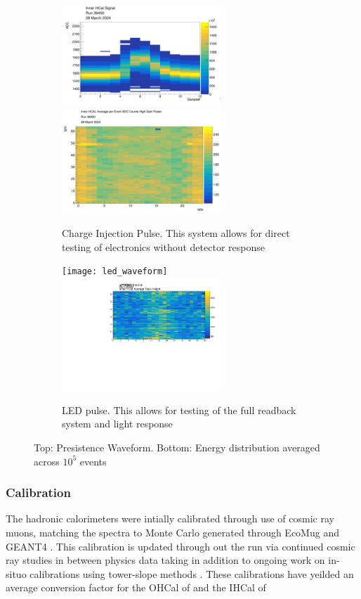 \documentclass[letterpaper, 12pt, oneside]{book}
\theoremstyle{definition}
\begin{document}
		\begin{figure}
			\begin{subfigure}[t]{0.4\textwidth}
				\includegraphics[width=6cm]{pulser_waveform}
				\includegraphics[width=6cm]{ihcal_pulser.png}
				\caption{Charge Injection Pulse. This system allows for direct testing of electronics without detector response}
			\end{subfigure}
			\hfill
			\begin{subfigure}[t]{0.4\textwidth}
				\texttt{[image: led\_waveform]}
				\includegraphics[width=6cm]{ihcal_led}
				\caption{LED pulse. This allows for testing of the full readback system and light response}
			\end{subfigure}
				\caption{Top: Presistence Waveform. Bottom: Energy distribution averaged across $10^{5}$ events}
			\label{fig:hcal_tests}
		\end{figure}
		\subsubsection{Calibration}
			The hadronic calorimeters were intially calibrated through use of cosmic ray muons, matching the spectra to Monte Carlo 
			generated through EcoMug and GEANT4 \cite{HCal_Calib}. 
			This calibration is updated through out the run via continued cosmic ray studies in between physics data taking in addition
			to ongoing work on in-situo calibrations using tower-slope methods \cite{tower_slope_hcal}. 
			These calibrations have yeilded an average conversion factor for the OHCal of and the IHCal of %
\end{document}
